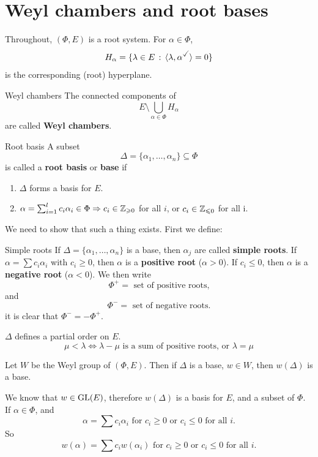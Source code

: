 \documentclass{article}
\begin{document}
\section{Weyl chambers and root bases}
Throughout, $(\Phi, E)$ is a root system. \gap For $\alpha \in \Phi$, \[ H_{\alpha} = \{ \lambda \in E \, : \, \langle \lambda, \alpha^{\checked}\rangle = 0\}\] is the corresponding (root) hyperplane. 
\begin{fancydefine*}{Weyl chambers}
    The connected components of \[ E \setminus \bigcup_{\alpha \in \Phi} H_{\alpha}\] are called \textbf{Weyl chambers}.
\end{fancydefine*}
\begin{fancydefine*}{Root basis}
    A subset \[\Delta = \{ \alpha_{1}, \dots, \alpha_{n} \} \subseteq \Phi\] is called a \textbf{root basis} or \textbf{base} if \begin{enumerate}
        \item $\Delta$ forms a basis for $E$.
        \item $\alpha = \sum_{i=1}^{l} c_{i}\alpha_{i} \in \Phi \Rightarrow c_{i} \in \mathbb{Z}_{\geqslant 0}$ for all $i$, or $c_{i} \in \mathbb{Z}_{\leqslant 0}$ for all i.
    \end{enumerate}
\end{fancydefine*}
We need to show that such a thing exists. First we define:
\begin{fancydefine}{Simple roots}
    If $\Delta = \{\alpha_{1}, \dots, \alpha_{n}\}$ is a base, then $\alpha_{j}$ are called \textbf{simple roots}. If $\alpha = \sum c_{i} \alpha_{i}$ with $c_{i} \geq 0$, then $\alpha$ is a \textbf{positive root} ($\alpha > 0$). If $c_{i} \leq 0$, then $\alpha$ is a \textbf{negative root} ($\alpha < 0$). \gap 
    We then write \[\Phi^{+} = \text{ set of positive roots,}\] and \[\Phi^{-} = \text{ set of negative roots.} \] it is clear that $\Phi^{-}=-\Phi^{+}.$
\end{fancydefine}
\begin{remark*}
    $\Delta$ defines a partial order on $E$. \[ \mu < \lambda \Leftrightarrow \lambda-\mu \text{ is a sum of positive roots, or } \lambda = \mu\]
\end{remark*}
\begin{fancylem}{}
    Let $W$ be the Weyl group of $(\Phi, E)$. Then if $\Delta$ is a base, $w \in W$, then $w(\Delta)$ is a base.
\end{fancylem}
\proof We know that $w \in \operatorname{GL}(E)$, therefore $w(\Delta)$ is a basis for $E$, and a subset of $\Phi$. If $\alpha \in \Phi$, and \[ \alpha = \sum c_{i}\alpha_{i} \text{ for $c_{i}\geq0$ or $c_{i} \leq 0$ for all $i$.}\] So \[ w(\alpha) = \sum c_{i}w(\alpha_{i}) \text{ for $c_{i}\geq0$ or $c_{i} \leq 0$ for all $i$.}\]
\end{document}

